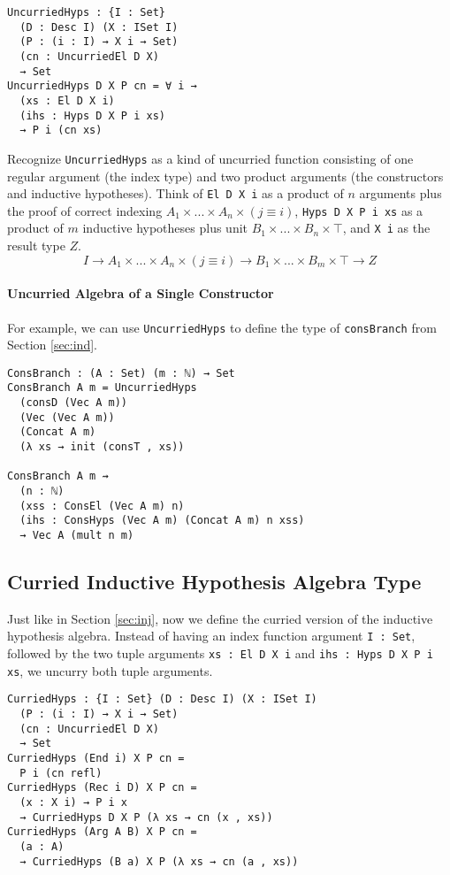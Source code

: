 \documentclass[nonatbib]{sigplanconf}
\newcommand{\refsec}[1]{Section \ref{sec:#1}}
\begin{document}
\begin{verbatim}
UncurriedHyps : {I : Set}
  (D : Desc I) (X : ISet I)
  (P : (i : I) → X i → Set)
  (cn : UncurriedEl D X)
  → Set
UncurriedHyps D X P cn = ∀ i →
  (xs : El D X i)
  (ihs : Hyps D X P i xs)
  → P i (cn xs)
\end{verbatim}

Recognize {\tt UncurriedHyps} as a kind of uncurried function
consisting of one regular argument (the index type) and two product
arguments (the constructors and inductive hypotheses). 
Think of
{\tt El D X i} as a product of $n$ arguments plus the proof of correct
indexing $A_1 × ... × A_n × (j≡i)$, {\tt Hyps D X P i xs} as a
product of $m$ inductive hypotheses plus unit $B_1 × ... × B_n × ⊤$,
and {\tt X i} as the result type $Z$.
\[
I → A_1 × ... × A_n × (j ≡ i) → B_1 × ... × B_m × ⊤ → Z
\]

\paragraph{Uncurried Algebra of a Single Constructor}

For example, we can use {\tt UncurriedHyps} to define the type of
{\tt consBranch} from \refsec{ind}.

\begin{verbatim}
ConsBranch : (A : Set) (m : ℕ) → Set
ConsBranch A m = UncurriedHyps
  (consD (Vec A m))
  (Vec (Vec A m))
  (Concat A m)
  (λ xs → init (consT , xs))

ConsBranch A m ⇝
  (n : ℕ)
  (xss : ConsEl (Vec A m) n)
  (ihs : ConsHyps (Vec A m) (Concat A m) n xss)
  → Vec A (mult n m)
\end{verbatim}

\subsection{Curried Inductive Hypothesis Algebra Type}

Just like in \refsec{inj}, now we define the curried version of
the inductive hypothesis algebra. Instead of having an index function
argument {\tt I : Set}, followed by the two tuple arguments
{\tt xs : El D X i} and {\tt ihs : Hyps D X P i xs}, we uncurry
both tuple arguments.

\begin{verbatim}
CurriedHyps : {I : Set} (D : Desc I) (X : ISet I)
  (P : (i : I) → X i → Set)
  (cn : UncurriedEl D X)
  → Set
CurriedHyps (End i) X P cn =
  P i (cn refl)
CurriedHyps (Rec i D) X P cn =
  (x : X i) → P i x
  → CurriedHyps D X P (λ xs → cn (x , xs))
CurriedHyps (Arg A B) X P cn =
  (a : A)
  → CurriedHyps (B a) X P (λ xs → cn (a , xs))
\end{verbatim}
\end{document}

